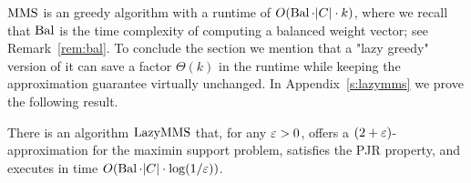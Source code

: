 $\operatorname{MMS}$ is an greedy algorithm with a runtime of $O(\operatorname{Bal} \cdot |C|\cdot k)$, where we recall that $\operatorname{Bal}$ is the time complexity of computing a balanced weight vector; see Remark~\ref{rem:bal}. 
To conclude the section we mention that a "lazy greedy" version of it can save a factor $\Theta(k)$ in the runtime while keeping the approximation guarantee virtually unchanged. 
In Appendix~\ref{s:lazymms} we prove the following result.

\begin{theorem}\label{thm:2eps}
There is an algorithm $\operatorname{LazyMMS}$ that, for any $\varepsilon>0$, offers a $(2+\varepsilon)$-approximation for the maximin support problem, satisfies the PJR property, and executes in time $O(\operatorname{Bal}\cdot |C|\cdot \log(1/\varepsilon))$.
\end{theorem}

